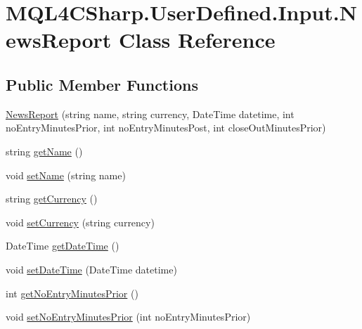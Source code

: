 \hypertarget{class_m_q_l4_c_sharp_1_1_user_defined_1_1_input_1_1_news_report}{}\section{M\+Q\+L4\+C\+Sharp.\+User\+Defined.\+Input.\+News\+Report Class Reference}
\label{class_m_q_l4_c_sharp_1_1_user_defined_1_1_input_1_1_news_report}
\subsection*{Public Member Functions}
\begin{DoxyCompactItemize}
\item 
\hyperlink{class_m_q_l4_c_sharp_1_1_user_defined_1_1_input_1_1_news_report_a1b021a494d1481e17855a9eaeb9259d1}{News\+Report} (string name, string currency, Date\+Time datetime, int no\+Entry\+Minutes\+Prior, int no\+Entry\+Minutes\+Post, int close\+Out\+Minutes\+Prior)
\item 
string \hyperlink{class_m_q_l4_c_sharp_1_1_user_defined_1_1_input_1_1_news_report_aa7babcc6e71b38923caccf65f957cb87}{get\+Name} ()
\item 
void \hyperlink{class_m_q_l4_c_sharp_1_1_user_defined_1_1_input_1_1_news_report_adca0d6baa2452ef549745edab6d57a3d}{set\+Name} (string name)
\item 
string \hyperlink{class_m_q_l4_c_sharp_1_1_user_defined_1_1_input_1_1_news_report_a14d1dfb8a993d957830437bf681e9424}{get\+Currency} ()
\item 
void \hyperlink{class_m_q_l4_c_sharp_1_1_user_defined_1_1_input_1_1_news_report_a91b8fbd4067fefb394309afcf25086e1}{set\+Currency} (string currency)
\item 
Date\+Time \hyperlink{class_m_q_l4_c_sharp_1_1_user_defined_1_1_input_1_1_news_report_acf95766669878ffe6c85cd447f72a1c4}{get\+Date\+Time} ()
\item 
void \hyperlink{class_m_q_l4_c_sharp_1_1_user_defined_1_1_input_1_1_news_report_a3be5726e2fd12d3abea7c35197ae3855}{set\+Date\+Time} (Date\+Time datetime)
\item 
int \hyperlink{class_m_q_l4_c_sharp_1_1_user_defined_1_1_input_1_1_news_report_a492b56467a9e6276a14cb6ccc148ac1d}{get\+No\+Entry\+Minutes\+Prior} ()
\item 
void \hyperlink{class_m_q_l4_c_sharp_1_1_user_defined_1_1_input_1_1_news_report_a2f607a4ab7549fec240e86949d5349a1}{set\+No\+Entry\+Minutes\+Prior} (int no\+Entry\+Minutes\+Prior)

\end{DoxyCompactItemize}
